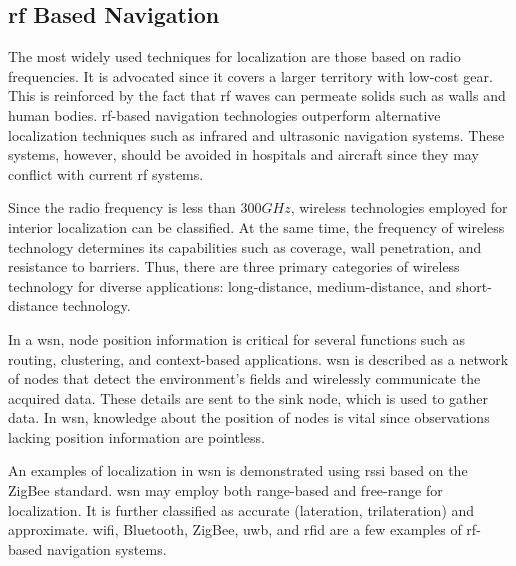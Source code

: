 \subsection{\acf{rf} Based Navigation}
The most widely used techniques for localization are those based on radio frequencies.
It is advocated since it covers a larger territory with low-cost gear.
This is reinforced by the fact that \ac{rf} waves can permeate solids such as walls and human bodies.
\ac{rf}-based navigation technologies outperform alternative localization techniques such as infrared and ultrasonic navigation systems.
These systems, however, should be avoided in hospitals and aircraft since they may conflict with current \ac{rf} systems.

Since the radio frequency is less than $300 GHz$, wireless technologies employed for interior localization can be classified.
At the same time, the frequency of wireless technology determines its capabilities such as coverage, wall penetration, and resistance to barriers.
Thus, there are three primary categories of wireless technology for diverse applications: long-distance, medium-distance, and short-distance technology.

In a \acf{wsn}, node position information is critical for several functions such as routing, clustering, and context-based applications.
\ac{wsn} is described as a network of nodes that detect the environment's fields and wirelessly communicate the acquired data\cite{reichenbach2006indoor}.
These details are sent to the sink node, which is used to gather data.
In \ac{wsn}, knowledge about the position of nodes is vital since observations lacking position information are pointless.

An examples of localization in \ac{wsn} is demonstrated using \ac{rssi} based on the ZigBee standard\cite{mankong20205}.
\ac{wsn} may employ both range-based and free-range for localization\cite{munadhil2020neural}.
It is further classified as accurate (lateration, trilateration) and approximate.
\ac{wifi}, Bluetooth, ZigBee, \acf{uwb}, and \acf{rfid} are a few examples of \ac{rf}-based navigation systems.

